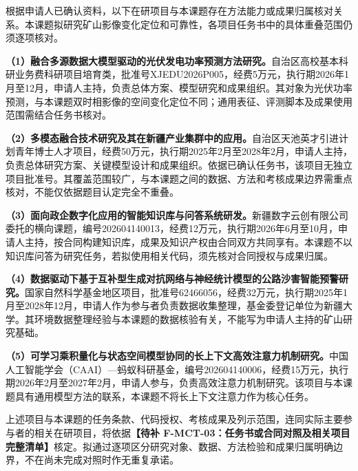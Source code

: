 \justifying
\NSFCBodyText

根据申请人已确认资料，以下在研项目与本课题存在方法能力或成果归属核对关系。本课题拟研究矿山影像变化定位和可靠性，各项目任务书中的具体重叠范围仍须逐项核对。

\textbf{（1）融合多源数据大模型驱动的光伏发电功率预测方法研究。}自治区高校基本科研业务费科研项目培育类，批准号XJEDU2026P005，经费5万元，执行期2026年1月至12月，申请人主持，负责总体方案、模型研究和成果组织。其对象为光伏功率预测，与本课题双时相影像的空间变化定位不同；通用表征、评测脚本及成果使用范围需结合任务书核对。

\textbf{（2）多模态融合技术研究及其在新疆产业集群中的应用。}自治区天池英才引进计划青年博士人才项目，经费50万元，执行期2025年2月至2028年2月，申请人主持，负责总体研究方案、关键模型设计和成果组织。依据已确认任务书，该项目无独立项目批准号。其覆盖范围较广，与本课题之间的数据、方法和考核成果边界需重点核对，不能仅依据题目认定完全不重叠。

\textbf{（3）面向政企数字化应用的智能知识库与问答系统研发。}新疆数字云创有限公司委托的横向课题，编号202604140013，经费12万元，执行期2026年6月至10月，申请人主持，按合同构建知识库，成果及知识产权由合同双方共同享有。本课题不以知识库问答为研究任务，若拟使用相关代码，须先核对合同授权与成果归属。

\textbf{（4）数据驱动下基于互补型生成对抗网络与神经统计模型的公路沙害智能预警研究。}国家自然科学基金地区项目，批准号62466056，经费32万元，执行期2025年1月至2028年12月，申请人作为参与者负责数据收集整理，基金委登记单位为新疆大学。其环境数据整理经验与本课题的数据核验有关，不能写为申请人主持的矿山研究基础。

\textbf{（5）可学习乘积量化与状态空间模型协同的长上下文高效注意力机制研究。}中国人工智能学会（CAAI）—蚂蚁科研基金，编号202604140006，经费15万元，执行期2026年2月至2027年2月，申请人参与，负责高效注意力机制研究。该项目与本课题具有通用模型方法的联系，本课题不将长上下文注意力作为核心任务。

上述项目与本课题的任务条款、代码授权、考核成果及列示范围，连同实际主要参与者的相关在研项目，将依据\textbf{【待补 F-MCT-03：任务书或合同对照及相关项目完整清单】}核定。拟通过逐项区分研究对象、数据、方法检验和成果归属明确边界，不在尚未完成对照时作无重复承诺。
